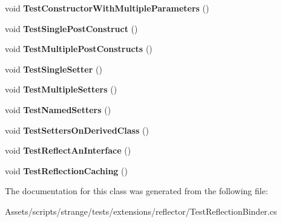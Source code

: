 \begin{DoxyCompactItemize}
\item 
\hypertarget{classstrange_1_1unittests_1_1_test_reflection_binder_aea252b56e357363e34c151080bf2acff}{void {\bfseries Test\-Constructor\-With\-Multiple\-Parameters} ()}\label{classstrange_1_1unittests_1_1_test_reflection_binder_aea252b56e357363e34c151080bf2acff}

\item 
\hypertarget{classstrange_1_1unittests_1_1_test_reflection_binder_a3247d1870e62d39d234506db3e1b4594}{void {\bfseries Test\-Single\-Post\-Construct} ()}\label{classstrange_1_1unittests_1_1_test_reflection_binder_a3247d1870e62d39d234506db3e1b4594}

\item 
\hypertarget{classstrange_1_1unittests_1_1_test_reflection_binder_ab06b36566f6be526394c5a2fc96f079e}{void {\bfseries Test\-Multiple\-Post\-Constructs} ()}\label{classstrange_1_1unittests_1_1_test_reflection_binder_ab06b36566f6be526394c5a2fc96f079e}

\item 
\hypertarget{classstrange_1_1unittests_1_1_test_reflection_binder_ab32b178698ed7f2b0448f890c6629fbb}{void {\bfseries Test\-Single\-Setter} ()}\label{classstrange_1_1unittests_1_1_test_reflection_binder_ab32b178698ed7f2b0448f890c6629fbb}

\item 
\hypertarget{classstrange_1_1unittests_1_1_test_reflection_binder_a9844d43b6b484a864d5f7eded64c68df}{void {\bfseries Test\-Multiple\-Setters} ()}\label{classstrange_1_1unittests_1_1_test_reflection_binder_a9844d43b6b484a864d5f7eded64c68df}

\item 
\hypertarget{classstrange_1_1unittests_1_1_test_reflection_binder_aa422745fa266a770eda73c63a6316149}{void {\bfseries Test\-Named\-Setters} ()}\label{classstrange_1_1unittests_1_1_test_reflection_binder_aa422745fa266a770eda73c63a6316149}

\item 
\hypertarget{classstrange_1_1unittests_1_1_test_reflection_binder_a7e84671470fa2950f76f064c5566f7e9}{void {\bfseries Test\-Setters\-On\-Derived\-Class} ()}\label{classstrange_1_1unittests_1_1_test_reflection_binder_a7e84671470fa2950f76f064c5566f7e9}

\item 
\hypertarget{classstrange_1_1unittests_1_1_test_reflection_binder_a713e8f9d89ff31af461229461cb0992e}{void {\bfseries Test\-Reflect\-An\-Interface} ()}\label{classstrange_1_1unittests_1_1_test_reflection_binder_a713e8f9d89ff31af461229461cb0992e}

\item 
\hypertarget{classstrange_1_1unittests_1_1_test_reflection_binder_a289987012aaecef5b0395788d39dcdcb}{void {\bfseries Test\-Reflection\-Caching} ()}\label{classstrange_1_1unittests_1_1_test_reflection_binder_a289987012aaecef5b0395788d39dcdcb}

\end{DoxyCompactItemize}


The documentation for this class was generated from the following file\-:\begin{DoxyCompactItemize}
\item 
Assets/scripts/strange/tests/extensions/reflector/Test\-Reflection\-Binder.\-cs\end{DoxyCompactItemize}
